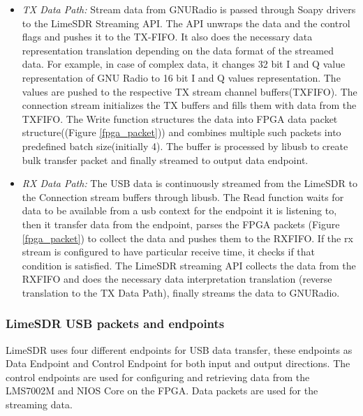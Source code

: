 \begin{itemize}
\item{\textit{TX Data Path:} Stream data from GNURadio is passed through Soapy drivers to the LimeSDR Streaming API. The API unwraps the data and the control flags and pushes it to the TX-FIFO. It also does the necessary data representation translation depending on the data format of the streamed data. For example, in case of complex data, it changes 32 bit I and Q value representation of GNU Radio to 16 bit I and Q values representation.  The values are pushed to the respective TX stream channel buffers(TXFIFO). The connection stream initializes the TX buffers and fills them with data from the TXFIFO. The Write function structures the data into FPGA data packet structure((Figure \ref{fpga_packet})) and combines multiple such packets into predefined batch size(initially 4). The buffer is processed by libusb to create bulk transfer packet and finally streamed to output data endpoint.}

\item{\textit{RX Data Path: } The USB data is continuously streamed from the LimeSDR to the Connection stream buffers through libusb. The Read function waits for data to be available from a usb context for the endpoint it is listening to, then it transfer data from the endpoint, parses the FPGA packets (Figure \ref{fpga_packet}) to collect the data and pushes them to the RXFIFO. If the rx stream is configured to have particular receive time, it checks if that condition is satisfied. The LimeSDR streaming API collects the data from the RXFIFO and does the necessary data interpretation translation (reverse translation to the TX Data Path), finally streams the data to GNURadio. }
\end{itemize}

\subsubsection{LimeSDR USB packets and endpoints}
LimeSDR uses four different endpoints for USB data transfer, these endpoints as Data Endpoint and Control Endpoint for both input and output directions. The control endpoints are used for configuring and retrieving data from the LMS7002M and NIOS Core on the FPGA. Data packets are used for the streaming data. 

